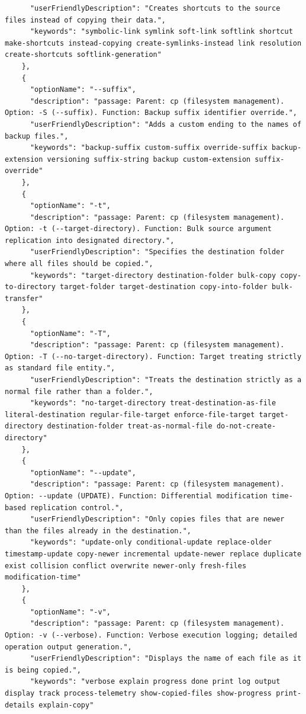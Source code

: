 \begin{appendix}
\begin{lstlisting}
      "userFriendlyDescription": "Creates shortcuts to the source files instead of copying their data.",
      "keywords": "symbolic-link symlink soft-link softlink shortcut make-shortcuts instead-copying create-symlinks-instead link resolution create-shortcuts softlink-generation"
    },
    {
      "optionName": "--suffix",
      "description": "passage: Parent: cp (filesystem management). Option: -S (--suffix). Function: Backup suffix identifier override.",
      "userFriendlyDescription": "Adds a custom ending to the names of backup files.",
      "keywords": "backup-suffix custom-suffix override-suffix backup-extension versioning suffix-string backup custom-extension suffix-override"
    },
    {
      "optionName": "-t",
      "description": "passage: Parent: cp (filesystem management). Option: -t (--target-directory). Function: Bulk source argument replication into designated directory.",
      "userFriendlyDescription": "Specifies the destination folder where all files should be copied.",
      "keywords": "target-directory destination-folder bulk-copy copy-to-directory target-folder target-destination copy-into-folder bulk-transfer"
    },
    {
      "optionName": "-T",
      "description": "passage: Parent: cp (filesystem management). Option: -T (--no-target-directory). Function: Target treating strictly as standard file entity.",
      "userFriendlyDescription": "Treats the destination strictly as a normal file rather than a folder.",
      "keywords": "no-target-directory treat-destination-as-file literal-destination regular-file-target enforce-file-target target-directory destination-folder treat-as-normal-file do-not-create-directory"
    },
    {
      "optionName": "--update",
      "description": "passage: Parent: cp (filesystem management). Option: --update (UPDATE). Function: Differential modification time-based replication control.",
      "userFriendlyDescription": "Only copies files that are newer than the files already in the destination.",
      "keywords": "update-only conditional-update replace-older timestamp-update copy-newer incremental update-newer replace duplicate exist collision conflict overwrite newer-only fresh-files modification-time"
    },
    {
      "optionName": "-v",
      "description": "passage: Parent: cp (filesystem management). Option: -v (--verbose). Function: Verbose execution logging; detailed operation output generation.",
      "userFriendlyDescription": "Displays the name of each file as it is being copied.",
      "keywords": "verbose explain progress done print log output display track process-telemetry show-copied-files show-progress print-details explain-copy"

\end{lstlisting}
\end{appendix}
